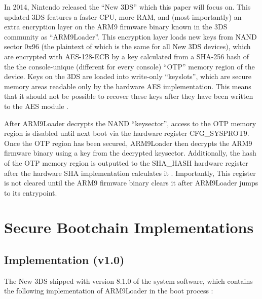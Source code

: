 \documentclass[journal]{IEEEtran}
\begin{document}
In 2014, Nintendo released the ``New 3DS'' which this paper will focus on. This
updated 3DS features a faster CPU, more RAM, and (most importantly) an extra
encryption layer on the ARM9 firmware binary known in the 3DS community as
``ARM9Loader''. This encryption layer loads new keys from NAND sector 0x96 (the
plaintext of which is the same for all New 3DS devices), which are encrypted
with AES-128-ECB by a key calculated from a SHA-256 hash of the the
console-unique (different for every console) ``OTP'' memory region of the device.
Keys on the 3DS are loaded into write-only ``keyslots'', which are secure memory
areas readable only by the hardware AES implementation. This means that it
should not be possible to recover these keys after they have been written to the
AES module \cite{AES_Registers}.

After ARM9Loader decrypts the NAND ``keysector'', access to the OTP memory region
is disabled until next boot via the hardware register CFG\_SYSPROT9. Once the
OTP region has been secured, ARM9Loader then decrypts the ARM9 firmware binary
using a key from the decrypted keysector. Additionally, the hash of the OTP
memory region is outputted to the SHA\_HASH hardware register after the hardware
SHA implementation calculates it \cite{SHA_Registers}. Importantly, This
register is not cleared until the ARM9 firmware binary clears it after
ARM9Loader jumps to its entrypoint.

\section{Secure Bootchain Implementations}

\subsection{Implementation (v1.0)}

The New 3DS shipped with version 8.1.0 of the system software, which contains
the following implementation of ARM9Loader in the boot process \cite{FIRM}:
\end{document}
